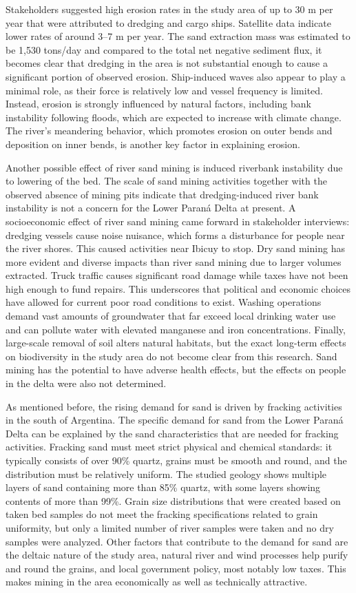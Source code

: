 Stakeholders suggested high erosion rates in the study area of up to 30 m per year that were attributed to dredging and cargo ships. Satellite data indicate lower rates of around 3–7 m per year. The sand extraction mass was estimated to be 1,530 tons/day and compared to the total net negative sediment flux, it becomes clear that dredging in the area is not substantial enough to cause a significant portion of observed erosion. Ship-induced waves also appear to play a minimal role, as their force is relatively low and vessel frequency is limited. Instead, erosion is strongly influenced by natural factors, including bank instability following floods, which are expected to increase with climate change. The river’s meandering behavior, which promotes erosion on outer bends and deposition on inner bends, is another key factor in explaining erosion.

Another possible effect of river sand mining is induced riverbank instability due to lowering of the bed. The scale of sand mining activities together with the observed absence of mining pits indicate that dredging-induced river bank instability is not a concern for the Lower Paraná Delta at present. A socioeconomic effect of river sand mining came forward in stakeholder interviews: dredging vessels cause noise nuisance, which forms a disturbance for people near the river shores. This caused activities near Ibicuy to stop. Dry sand mining has more evident and diverse impacts than river sand mining due to larger volumes extracted. Truck traffic causes significant road damage while taxes have not been high enough to fund repairs. This underscores that political and economic choices have allowed for current poor road conditions to exist. Washing operations demand vast amounts of groundwater that far exceed local drinking water use and can pollute water with elevated manganese and iron concentrations. Finally, large-scale removal of soil alters natural habitats, but the exact long-term effects on biodiversity in the study area do not become clear from this research. Sand mining has the potential to have adverse health effects, but the effects on people in the delta were also not determined.

As mentioned before, the rising demand for sand is driven by fracking activities in the south of Argentina. The specific demand for sand from the Lower Paraná Delta can be explained by the sand characteristics that are needed for fracking activities. Fracking sand must meet strict physical and chemical standards: it typically consists of over 90\% quartz, grains must be smooth and round, and the distribution must be relatively uniform. The studied geology shows multiple layers of sand containing more than 85\% quartz, with some layers showing contents of more than 99\%. Grain size distributions that were created based on taken bed samples do not meet the fracking specifications related to grain uniformity, but only a limited number of river samples were taken and no dry samples were analyzed. Other factors that contribute to the demand for sand are the deltaic nature of the study area, natural river and wind processes help purify and round the grains, and local government policy, most notably low taxes. This makes mining in the area economically as well as technically attractive.

